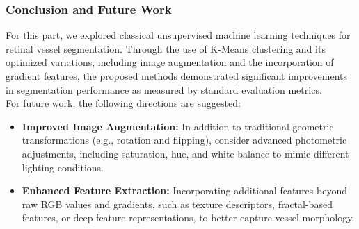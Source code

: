 \documentclass[12pt,letterpaper]{article}
\begin{document}
\subsubsection{Conclusion and Future Work}
For this part, we explored classical unsupervised machine learning techniques for retinal vessel segmentation. Through the use of K-Means clustering and its optimized variations, including image augmentation and the incorporation of gradient features, the proposed methods demonstrated significant improvements in segmentation performance as measured by standard evaluation metrics. \\
For future work, the following directions are suggested:
\begin{itemize}
    \item \textbf{Improved Image Augmentation:} In addition to traditional geometric transformations (e.g., rotation and flipping), consider advanced photometric adjustments, including saturation, hue, and white balance to mimic different lighting conditions. 
    \item \textbf{Enhanced Feature Extraction:} Incorporating additional features beyond raw RGB values and gradients, such as texture descriptors, fractal-based features, or deep feature representations, to better capture vessel morphology.
\end{itemize}
\end{document}
